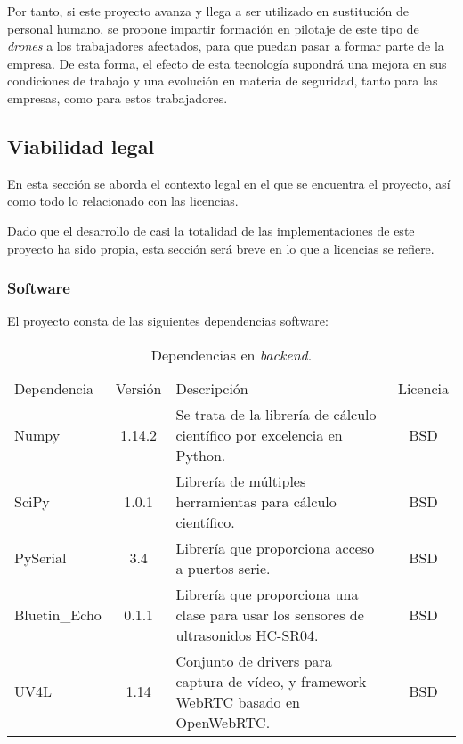 Por tanto, si este proyecto avanza y llega a ser utilizado en sustitución de personal humano, se propone impartir formación en pilotaje de este tipo de \emph{drones} a los trabajadores afectados, para que puedan pasar a formar parte de la empresa. De esta forma, el efecto de esta tecnología supondrá una mejora en sus condiciones de trabajo y una evolución en materia de seguridad, tanto para las empresas, como para estos trabajadores.


\subsection{Viabilidad legal}

En esta sección se aborda el contexto legal en el que se encuentra el proyecto, así como todo lo relacionado con las licencias. 

Dado que el desarrollo de casi la totalidad de las implementaciones de este proyecto ha sido propia, esta sección será breve en lo que a licencias se refiere. 

\subsubsection{Software}
El proyecto consta de las siguientes dependencias software:

\begin{table}[H]
\begin{center}
		\begin{tabular}{l  c  m{6cm}  c}\hline
			\toprule
			Dependencia & Versión & Descripción & Licencia\\
			\otoprule
			Numpy & 1.14.2 & Se trata de la librería de cálculo científico por excelencia en Python.  & BSD  \\
			SciPy & 1.0.1 & Librería de múltiples herramientas para cálculo científico.  & BSD\\
			PySerial & 3.4 & Librería que proporciona acceso a puertos serie. & BSD\\
			Bluetin\_Echo & 0.1.1 & Librería que proporciona una clase para usar los sensores de ultrasonidos HC-SR04. & BSD\\
			UV4L & 1.14 & Conjunto de drivers para captura de vídeo, y framework WebRTC basado en OpenWebRTC. & BSD\\
			
			\bottomrule
		\end{tabular}
		\caption{Dependencias en \emph{backend}.}
		\label{tb:licensebackend}
		\end{center}
\end{table}

